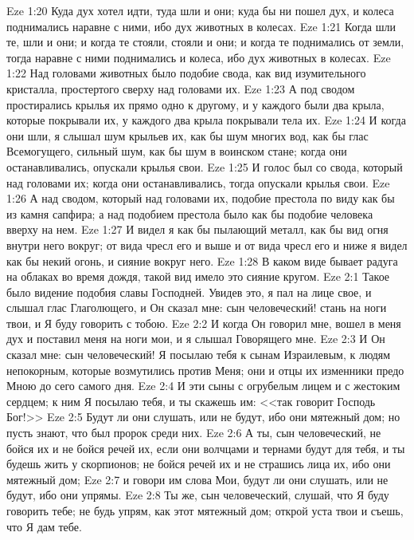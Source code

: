 \vs Eze 1:20 Куда дух хотел идти, туда шли и они; куда бы ни пошел дух, и колеса поднимались наравне с ними, ибо дух животных  в колесах.
\vs Eze 1:21 Когда шли те, шли и они; и когда те стояли, стояли и они; и когда те поднимались от земли, тогда наравне с ними поднимались и колеса, ибо дух животных  в колесах.
\vs Eze 1:22 Над головами животных было подобие свода, как вид изумительного кристалла, простертого сверху над головами их.
\vs Eze 1:23 А под сводом простирались крылья их прямо одно к другому, и у каждого были два крыла, которые покрывали их, у каждого два крыла покрывали тела их.
\vs Eze 1:24 И когда они шли, я слышал шум крыльев их, как бы шум многих вод, как бы глас Всемогущего, сильный шум, как бы шум в воинском стане;  когда они останавливались, опускали крылья свои.
\vs Eze 1:25 И голос был со свода, который над головами их; когда они останавливались, тогда опускали крылья свои.
\vs Eze 1:26 А над сводом, который над головами их,  подобие престола по виду как бы из камня сапфира; а над подобием престола было как бы подобие человека вверху на нем.
\vs Eze 1:27 И видел я как бы пылающий металл, как бы вид огня внутри него вокруг; от вида чресл его и выше и от вида чресл его и ниже я видел как бы некий огонь, и сияние  вокруг него.
\vs Eze 1:28 В каком виде бывает радуга на облаках во время дождя, такой вид имело это сияние кругом.
\vs Eze 2:1 Такое было видение подобия славы Господней. Увидев это, я пал на лице свое, и слышал глас Глаголющего, и Он сказал мне: сын человеческий! стань на ноги твои, и Я буду говорить с тобою.
\vs Eze 2:2 И когда Он говорил мне, вошел в меня дух и поставил меня на ноги мои, и я слышал Говорящего мне.
\vs Eze 2:3 И Он сказал мне: сын человеческий! Я посылаю тебя к сынам Израилевым, к людям непокорным, которые возмутились против Меня; они и отцы их изменники предо Мною до сего самого дня.
\vs Eze 2:4 И эти сыны с огрубелым лицем и с жестоким сердцем; к ним Я посылаю тебя, и ты скажешь им: <<так говорит Господь Бог!>>
\vs Eze 2:5 Будут ли они слушать, или не будут, ибо они мятежный дом; но пусть знают, что был пророк среди них.
\vs Eze 2:6 А ты, сын человеческий, не бойся их и не бойся речей их, если они волчцами и тернами будут для тебя, и ты будешь жить у скорпионов; не бойся речей их и не страшись лица их, ибо они мятежный дом;
\vs Eze 2:7 и говори им слова Мои, будут ли они слушать, или не будут, ибо они упрямы.
\vs Eze 2:8 Ты же, сын человеческий, слушай, что Я буду говорить тебе; не будь упрям, как этот мятежный дом; открой уста твои и съешь, что Я дам тебе.
